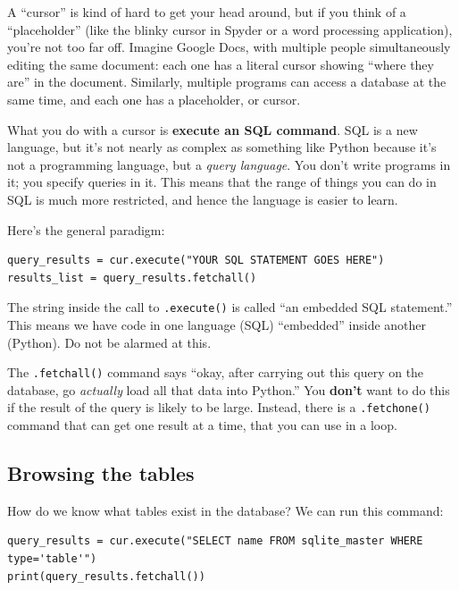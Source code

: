 A ``cursor'' is kind of hard to get your head around, but if you think of a
``placeholder'' (like the blinky cursor in Spyder or a word processing
application), you're not too far off. Imagine Google Docs, with multiple
people simultaneously editing the same document: each one has a literal cursor
showing ``where they are'' in the document. Similarly, multiple programs can
access a database at the same time, and each one has a placeholder, or cursor.

What you do with a cursor is \textbf{execute an SQL command}. SQL is a new
language, but it's not nearly as complex as something like Python because it's
not a programming language, but a \textit{query language}. You don't write
programs in it; you specify queries in it. This means that the range of things
you can do in SQL is much more restricted, and hence the language is easier to
learn.

Here's the general paradigm:
\begin{Verbatim}[fontsize=\small,samepage=true,frame=single]
query_results = cur.execute("YOUR SQL STATEMENT GOES HERE")
results_list = query_results.fetchall()
\end{Verbatim}

The string inside the call to \texttt{.execute()} is called ``an embedded SQL
statement.'' This means we have code in one language (SQL) ``embedded'' inside
another (Python). Do not be alarmed at this.

The \texttt{.fetchall()} command says ``okay, after carrying out this query on
the database, go \textit{actually} load all that data into Python.'' You
\textbf{don't} want to do this if the result of the query is likely to be
large. Instead, there is a \texttt{.fetchone()} command that can get one
result at a time, that you can use in a loop.

\subsection{Browsing the tables}

How do we know what tables exist in the database? We can run this command:

\begin{Verbatim}[fontsize=\footnotesize,samepage=true,frame=single]
query_results = cur.execute("SELECT name FROM sqlite_master WHERE type='table'")
print(query_results.fetchall())
\end{Verbatim}

